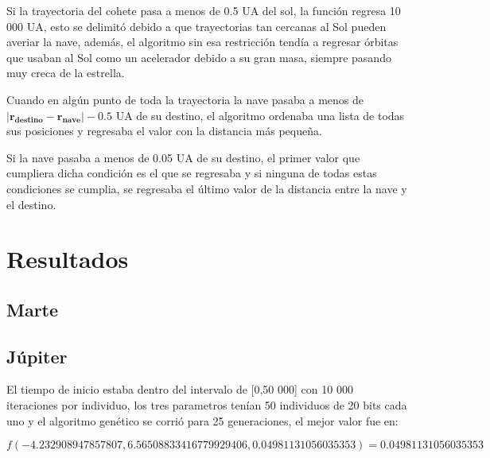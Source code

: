 \documentclass[12pt,letterpaper]{article}
\begin{document}
Si la trayectoria del cohete pasa a menos de 0.5 UA del sol, la función regresa 10 000 UA, esto se delimitó debido a que trayectorias tan cercanas al Sol pueden averiar la nave, además, el algoritmo sin esa restricción tendía a regresar órbitas que usaban al Sol como un acelerador debido a su gran masa, siempre pasando muy creca de la estrella.

Cuando en algún punto de toda la trayectoria la nave pasaba a menos de $|\mathbf{r_{destino}}-\mathbf{r_{nave}}|-0.5$ UA de su destino, el algoritmo ordenaba una lista de todas sus posiciones y regresaba el valor con la distancia más pequeña.

Si la nave pasaba a menos de 0.05 UA de su destino, el primer valor que cumpliera dicha condición es el que se regresaba y si ninguna de todas estas condiciones se cumplia, se regresaba el último valor de la distancia entre la nave y el destino.

\section*{Resultados}

\subsection*{Marte}

\subsection*{Júpiter}

El tiempo de inicio estaba dentro del intervalo de [0,50 000] con 10 000 iteraciones por individuo, los tres parametros tenían 50 individuos de 20 bits cada uno y el algoritmo genético se corrió para 25 generaciones, el mejor valor fue en:

\[
f(-4.232908947857807, 6.565088334167799 29406, 0.04981131056035353) = 0.04981131056035353
\]
\end{document}
